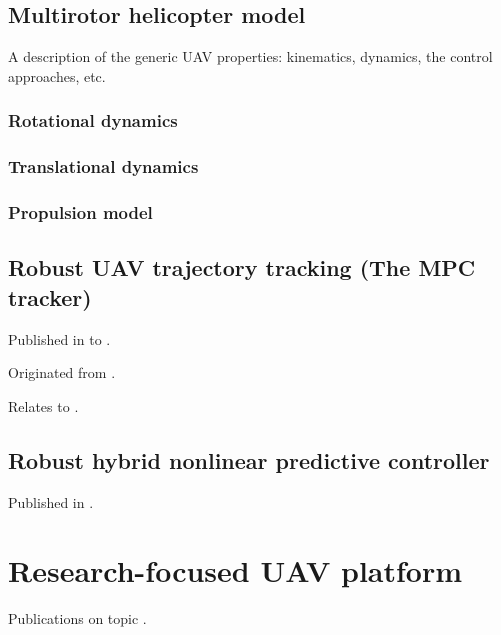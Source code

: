 \documentclass[a4paper,11pt,titlepage,twoside]{book}
\newcommand{\chapternoclear}[1]{
  \begingroup
  \let\cleardoublepage\clearpage
  \chapter{#1}
  \endgroup
}
\begin{document}

\section{Multirotor helicopter model}

A description of the generic UAV properties: kinematics, dynamics, the control approaches, etc.

\subsection{Rotational dynamics}

\subsection{Translational dynamics}

\subsection{Propulsion model}

\section{Robust UAV trajectory tracking (The MPC tracker)}

Published in to \cite{baca2018model}.

Originated from \cite{baca2016embedded}.

Relates to \cite{baca2019autonomous, baca2017autonomous, spurny2019cooperative, loianno2018localization, saska2017documentation}.

\section{Robust hybrid nonlinear predictive controller}

Published in \cite{petrlik2020robust, roucek2019darpa,}.



\chapternoclear{Research-focused UAV platform}

Publications on topic \cite{baca2016embedded, baca2018model, petrlik2020robust, baca2019autonomous, spurny2019cooperative}.
\end{document}
